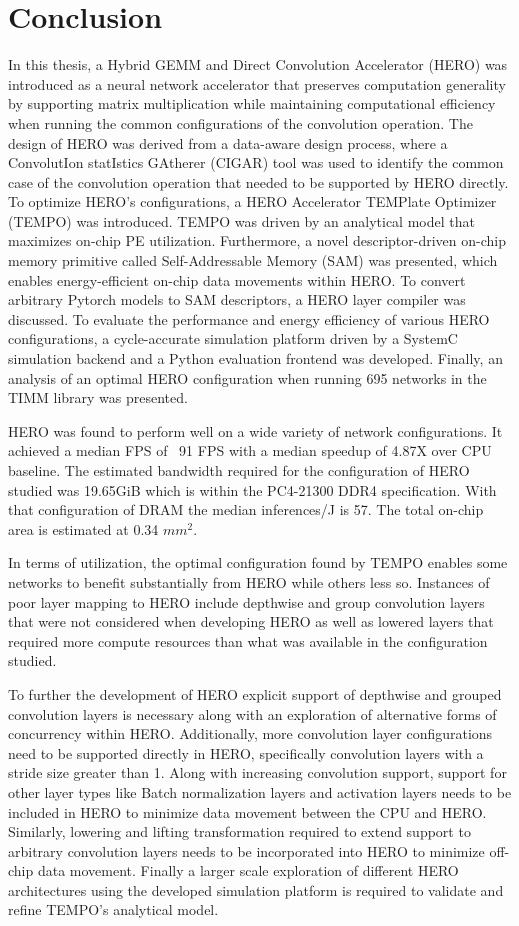 \chapter{Conclusion}
\label{chap:conclude}

In this thesis, a Hybrid GEMM and Direct Convolution Accelerator (HERO) was
introduced as a neural network accelerator that preserves computation generality
by supporting matrix multiplication while maintaining computational efficiency
when running the common configurations of the convolution operation. The design
of HERO was derived from a data-aware design process, where a ConvolutIon
statIstics GAtherer (CIGAR) tool was used to identify the common case of the
convolution operation that needed to be supported by HERO directly. To optimize
HERO's configurations, a HERO Accelerator TEMPlate Optimizer (TEMPO) was
introduced. TEMPO was driven by an analytical model that maximizes on-chip PE
utilization. Furthermore, a novel descriptor-driven on-chip memory primitive
called Self-Addressable Memory (SAM) was presented, which enables
energy-efficient on-chip data movements within HERO. To convert arbitrary
Pytorch models to SAM descriptors, a HERO layer compiler was discussed. To
evaluate the performance and energy efficiency of various HERO configurations, a
cycle-accurate simulation platform driven by a SystemC simulation backend and a
Python evaluation frontend was developed. Finally, an analysis of an optimal
HERO configuration when running 695 networks in the TIMM library was presented.

HERO was found to perform well on a wide variety of network configurations. It
achieved a median FPS of ~91 FPS with a median speedup of 4.87X over CPU
baseline. The estimated bandwidth required for the configuration of HERO studied
was 19.65GiB which is within the PC4-21300 DDR4 specification. With that
configuration of DRAM the median inferences/J is 57. The total on-chip area is
estimated at 0.34 $mm^2$. 

In terms of utilization, the optimal configuration found by TEMPO enables some
networks to benefit substantially from HERO while others less so. Instances of
poor layer mapping to HERO include depthwise and group convolution layers that
were not considered when developing HERO as well as lowered layers that required more
compute resources than what was available in the configuration studied. 

To further the development of HERO explicit support of depthwise and grouped
convolution layers is necessary along with an exploration of alternative forms
of concurrency within HERO. Additionally, more convolution layer configurations
need to be supported directly in HERO, specifically convolution layers with a
stride size greater than 1. Along with increasing convolution support, support
for other layer types like Batch normalization layers and activation layers
needs to be included in HERO to minimize data movement between the CPU and HERO.
Similarly, lowering and lifting transformation required to extend support to
arbitrary convolution layers needs to be incorporated into HERO to minimize
off-chip data movement. Finally a larger scale exploration of different HERO
architectures using the developed simulation platform is required to validate
and refine TEMPO's analytical model.